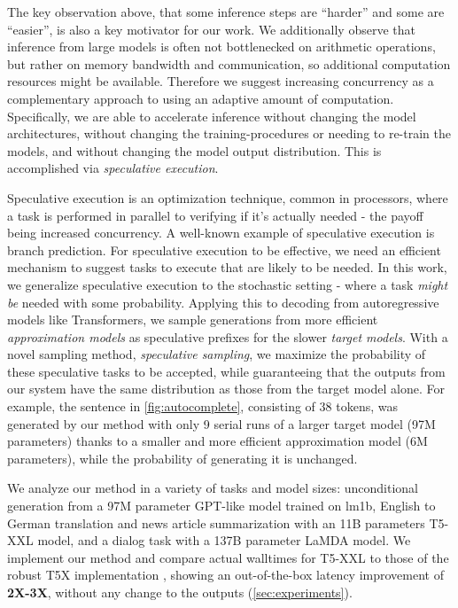 The key observation above, that some inference steps are ``harder'' and some are ``easier'', is also a key motivator for our work. We additionally observe that inference from large models is often not bottlenecked on arithmetic operations, but rather on memory bandwidth and communication, so additional computation resources might be available. Therefore we suggest increasing concurrency as a complementary approach to using an adaptive amount of computation. Specifically, we are able to accelerate inference without changing the model architectures, without changing the training-procedures or needing to re-train the models, and without changing the model output distribution. This is accomplished via \emph{speculative execution}.

Speculative execution \cite{speculative_computation, HennessyPatterson12} is an optimization technique, common in processors, where a task is performed in parallel to verifying if it's actually needed - the payoff being increased concurrency. A well-known example of speculative execution is branch prediction. For speculative execution to be effective, we need an efficient mechanism to suggest tasks to execute that are likely to be needed. In this work, we generalize speculative execution to the stochastic setting - where a task \emph{might be} needed with some probability. Applying this to decoding from autoregressive models like Transformers, we sample generations from more efficient \emph{approximation models} as speculative prefixes for the slower \emph{target models}. With a novel sampling method, \emph{speculative sampling}, we maximize the probability of these speculative tasks to be accepted, while guaranteeing that the outputs from our system have the same distribution as those from the target model alone. For example, the sentence in \ref{fig:autocomplete}, consisting of 38 tokens, was generated by our method with only 9 serial runs of a larger target model (97M parameters) thanks to a smaller and more efficient approximation model (6M parameters), while the probability of generating it is unchanged.

We analyze our method in a variety of tasks and model sizes: unconditional generation from a 97M parameter GPT-like model trained on lm1b, English to German translation and news article summarization with an 11B parameters T5-XXL model, and a dialog task with a 137B parameter LaMDA model. We implement our method and compare actual walltimes for T5-XXL to those of the robust T5X implementation \cite{t5x}, showing an out-of-the-box latency improvement of \textbf{2X-3X}, without any change to the outputs (\ref{sec:experiments}).

